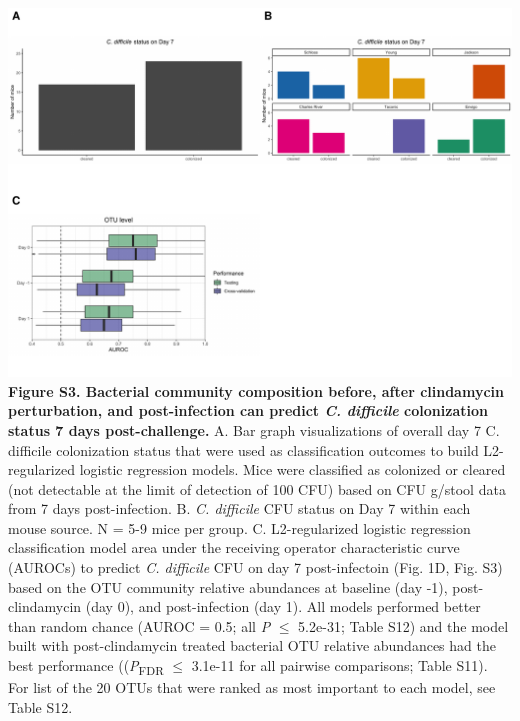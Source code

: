 \documentclass[11pt,]{article}
\begin{document}
\includegraphics{figure_S3.pdf} \textbf{Figure S3. Bacterial community
composition before, after clindamycin perturbation, and post-infection
can predict \emph{C. difficile} colonization status 7 days
post-challenge.} A. Bar graph visualizations of overall day 7 C.
difficile colonization status that were used as classification outcomes
to build L2-regularized logistic regression models. Mice were classified
as colonized or cleared (not detectable at the limit of detection of 100
CFU) based on CFU g/stool data from 7 days post-infection. B. \emph{C.
difficile} CFU status on Day 7 within each mouse source. N = 5-9 mice
per group. C. L2-regularized logistic regression classification model
area under the receiving operator characteristic curve (AUROCs) to
predict \emph{C. difficile} CFU on day 7 post-infectoin (Fig. 1D, Fig.
S3) based on the OTU community relative abundances at baseline (day -1),
post-clindamycin (day 0), and post-infection (day 1). All models
performed better than random chance (AUROC = 0.5; all \emph{P} \(\le\)
5.2e-31; Table S12) and the model built with post-clindamycin treated
bacterial OTU relative abundances had the best performance
((\emph{P}\textsubscript{FDR} \(\le\) 3.1e-11 for all pairwise
comparisons; Table S11). For list of the 20 OTUs that were ranked as
most important to each model, see Table S12.

\newpage
\end{document}
